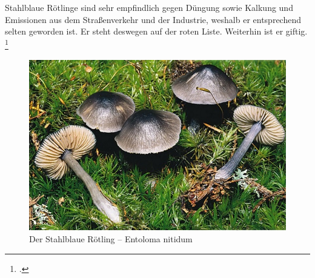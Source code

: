 \documentclass[a4paper,abstracton]{scrreprt}
\begin{document}
Stahlblaue Rötlinge sind sehr empfindlich gegen Düngung sowie Kalkung und Emissionen aus dem Straßenverkehr und der Industrie, weshalb er entsprechend selten geworden ist. Er steht deswegen auf der roten Liste. Weiterhin ist er giftig.
\footcite{stahlblau}
\begin{figure}[H]
\centering
\includegraphics[scale=0.3]{stahlblau}
\caption{Der Stahlblaue Rötling -- Entoloma nitidum }
\label{fig:stahlblau}
\end{figure}

\printbibliography[heading=lit]
\end{document}
